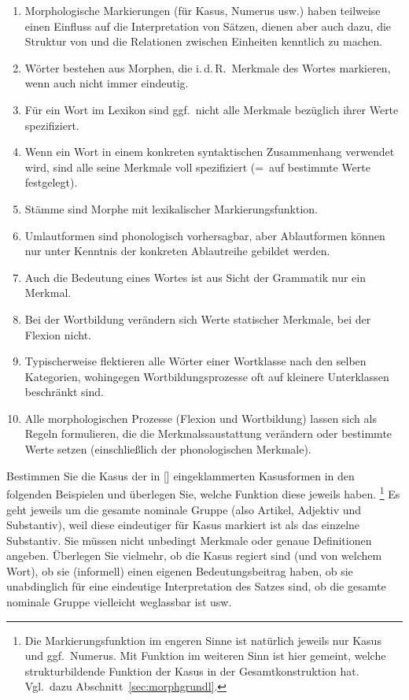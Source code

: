 \begin{enumerate}
  \item Morphologische Markierungen (\zB für Kasus, Numerus usw.) haben teilweise einen Einfluss auf die Interpretation von Sätzen, dienen aber auch dazu, die Struktur von und die Relationen zwischen Einheiten kenntlich zu machen.
  \item Wörter bestehen aus Morphen, die i.\,d.\,R.\ Merkmale des Wortes markieren, wenn auch nicht immer eindeutig.
  \item Für ein Wort im Lexikon sind ggf.\ nicht alle Merkmale bezüglich ihrer Werte spezifiziert.
  \item Wenn ein Wort in einem konkreten syntaktischen Zusammenhang verwendet wird, sind alle seine Merkmale voll spezifiziert (=~auf bestimmte Werte festgelegt).
  \item Stämme sind Morphe mit lexikalischer Markierungsfunktion.
  \item Umlautformen sind phonologisch vorhersagbar, aber Ablautformen können nur unter Kenntnis der konkreten Ablautreihe gebildet werden.
  \item Auch die Bedeutung eines Wortes ist aus Sicht der Grammatik nur ein Merkmal.
  \item Bei der Wortbildung verändern sich Werte statischer Merkmale, bei der Flexion nicht.
  \item Typischerweise flektieren alle Wörter einer Wortklasse nach den selben Kategorien, wohingegen Wortbildungsprozesse oft auf kleinere Unterklassen beschränkt sind.
  \item Alle morphologischen Prozesse (Flexion und Wortbildung) lassen sich als Regeln formulieren, die die Merkmalssaustattung verändern oder bestimmte Werte setzen (einschließlich der phonologischen Merkmale).
\end{enumerate}

\Uebungen

\Uebung[\tristar] \label{u61} Bestimmen Sie die Kasus der in [] eingeklammerten Kasusformen in den folgenden Beispielen und überlegen Sie, welche Funktion diese jeweils haben.%
\footnote{Die Markierungsfunktion im engeren Sinne ist natürlich jeweils nur Kasus und ggf.\ Numerus.
Mit Funktion im weiteren Sinn ist hier gemeint, welche strukturbildende Funktion der Kasus in der Gesamtkonstruktion hat.
Vgl.\ dazu Abschnitt~\ref{sec:morphgrundl}.}
Es geht jeweils um die gesamte nominale Gruppe (also Artikel, Adjektiv und Substantiv), weil diese eindeutiger für Kasus markiert ist als das einzelne Substantiv.
Sie müssen nicht unbedingt Merkmale oder genaue Definitionen angeben.
Überlegen Sie vielmehr, ob die Kasus regiert sind (und von welchem Wort), ob sie (informell) einen eigenen Bedeutungsbeitrag haben, ob sie unabdinglich für eine eindeutige Interpretation des Satzes sind, ob die gesamte nominale Gruppe vielleicht weglassbar ist usw.

